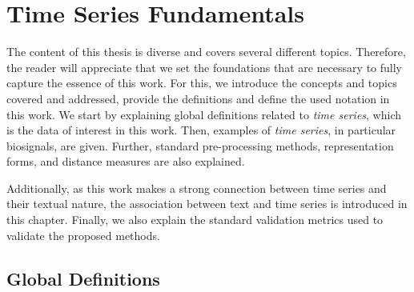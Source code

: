 
%

\chapter{Time Series Fundamentals}
\label{cha:theory}

The content of this thesis is diverse and covers several different topics. Therefore, the reader will appreciate that we set the foundations that are necessary to fully capture the essence of this work. For this, we introduce the concepts and topics covered and addressed, provide the definitions and define the used notation in this work. We start by explaining global definitions related to \textit{time series}, which is the data of interest in this work. Then, examples of \textit{time series}, in particular biosignals, are given. Further, standard pre-processing methods, representation forms, and distance measures are also explained.
\par
Additionally, as this work makes a strong connection between time series and their textual nature, the association between text and time series is introduced in this chapter. Finally, we also explain the standard validation metrics used to validate the proposed methods.

\section{Global Definitions}
\label{sec:global}

